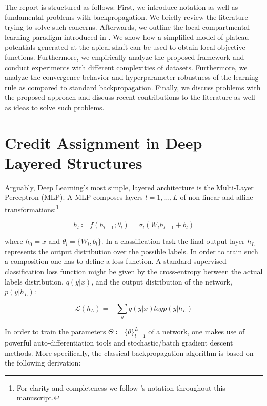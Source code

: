 \documentclass[colorinlistoftodos]{article}
\theoremstyle{definition}
\begin{document}
The report is structured as follows: First, we introduce notation as well as fundamental problems with backpropagation. We briefly review the literature trying to solve such concerns.
Afterwards, we outline the local compartmental learning paradigm introduced in \citet{guerguiev2017}. We show how a simplified model of plateau potentials generated at the apical shaft can be used to obtain local objective functions.
Furthermore, we empirically analyze the proposed framework and conduct experiments with different complexities of datasets. Furthermore, we analyze the convergence behavior and hyperparameter robustness of the learning rule as compared to standard backpropagation.
Finally, we discuss problems with the proposed approach and discuss recent contributions to the literature as well as ideas to solve such problems.



\newpage
\section{Credit Assignment in Deep Layered Structures}

Arguably, Deep Learning's most simple, layered architecture is the Multi-Layer Perceptron (MLP). A MLP composes layers $l=1, \dots, L$ of non-linear and affine transformations:\footnote{For clarity and completeness we follow \citet{bartunov2018}'s notation throughout this manuscript.}

$$h_l \coloneqq f(h_{l-1}; \theta_l) = \sigma_l (W_l h_{l-1} + b_l)$$ 

where $h_0 = x$ and $\theta_l = \{W_l, b_l\}$. In a classification task the final output layer $h_L$ represents the output distribution over the possible labels. In order to train such a composition one has to define a loss function. A standard supervised classification loss function might be given by the cross-entropy between the actual labels distribution, $q(y|x)$, and the output distribution of the network, $p(y|h_L)$:

$$\mathcal{L}(h_L) = - \sum_y q(y|x) log p(y|h_L)$$

In order to train the parameters $\Theta \coloneqq \{\theta\}_{l=1}^L$ of a network, one makes use of powerful auto-differentiation tools and stochastic/batch gradient descent methods. More specifically, the classical backpropagation algorithm is based on the following derivation:
\end{document}

